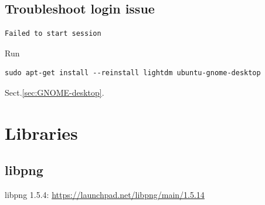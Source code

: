\subsection{Troubleshoot login issue}

\begin{verbatim}
Failed to start session
\end{verbatim}
Run
\begin{verbatim}
sudo apt-get install --reinstall lightdm ubuntu-gnome-desktop
\end{verbatim}
Sect.\ref{sec:GNOME-desktop}.




\section{Libraries}


\subsection{libpng}
\label{sec:libpng}

libpng 1.5.4: \url{https://launchpad.net/libpng/main/1.5.14}
\begin{verbatim}

\end{verbatim}
